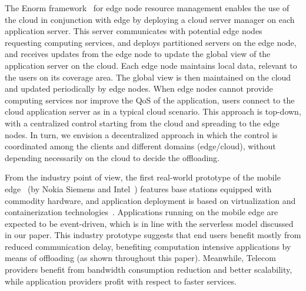 
The Enorm framework~\cite{wang2017enorm} for edge node resource management enables the use of the cloud in conjunction with edge
by deploying a cloud server manager on
each application server. This server communicates with
potential edge nodes requesting computing services, and
deploys partitioned servers on the edge node, and receives updates from the edge node to update the global view of the application server on the cloud. Each edge node maintains local data, relevant to the users on its coverage area. The global view is then maintained on the cloud and updated periodically by edge nodes. When edge nodes cannot provide computing services nor improve the QoS of the application, users connect to the cloud application server as in a typical cloud scenario. This approach is top-down, with a centralized control starting from the cloud and spreading to the edge nodes. In turn, we envision a decentralized approach in which the control is coordinated among the clients and different domains (edge/cloud), without depending necessarily on the cloud to decide the offloading. %


From the industry point of view, the first real-world prototype of the mobile edge~\cite{beck2014mobile} (by Nokia Siemens and Intel~\cite{NokiaMEC13}) features base stations equipped with commodity hardware, and application deployment is based on virtualization and containerization technologies~\cite{ismail2015icos}.  Applications running on the mobile edge are expected to be event-driven, which is in line with the serverless model discussed in our paper. 
This industry prototype suggests that end users
benefit mostly from reduced communication delay, benefiting computation intensive applications by means of offloading (as shown throughout this paper). Meanwhile, Telecom providers benefit from bandwidth consumption reduction and better scalability, while application providers profit with respect to faster
services.

